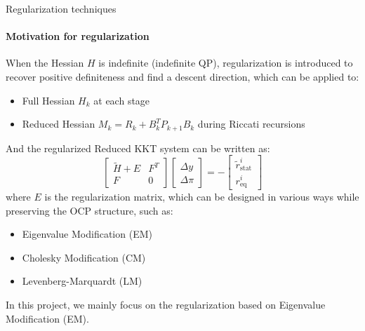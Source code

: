\documentclass[10pt,aspectratio=1610]{beamer} %
\begin{document}
\begin{frame}{Regularization techniques}
    \framesubtitle{Motivation for regularization}
	When the Hessian $H$ is indefinite (indefinite QP), regularization is introduced to recover positive definiteness and find a descent direction, 
    which can be applied to: 
    \pause
    \begin{itemize}
        \item Full Hessian $H_k$ at each stage
        \pause
        \item Reduced Hessian $M_k = R_k + B_k^T P_{k+1} B_k$ during Riccati recursions
    \end{itemize}
    \pause
    And the regularized Reduced KKT system can be written as:
	\begin{equation}
		\begin{bmatrix}
		 \tilde{H} + E & F^T \\
		F & 0
		\end{bmatrix}
		\begin{bmatrix}
		\Delta y \\
		\Delta \pi
		\end{bmatrix} = -
		\begin{bmatrix}
		\tilde{r}_{\mathrm{stat}}^i \\
		r_{\mathrm{eq}}^i
		\end{bmatrix}
	\end{equation}
    where $E$ is the regularization matrix, which can be designed in various ways while preserving the OCP structure, such as:
    \begin{itemize}
        \item Eigenvalue Modification (EM)
        \item Cholesky Modification (CM)
        \item Levenberg-Marquardt (LM)
    \end{itemize}
    \pause
    In this project, we mainly focus on the regularization based on Eigenvalue Modification (EM).
\end{frame}
\end{document}
